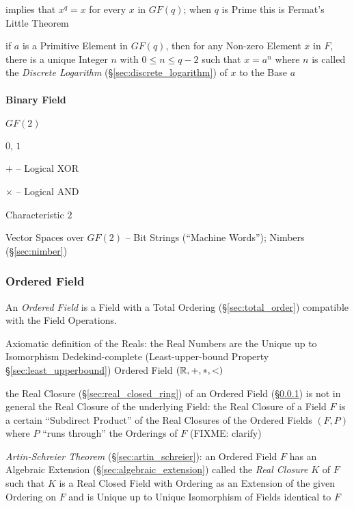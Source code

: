 implies that $x^q = x$ for every $x$ in $GF(q)$; when $q$ is Prime this is
Fermat's Little Theorem

if $a$ is a Primitive Element in $GF(q)$, then for any Non-zero Element $x$ in
$F$, there is a unique Integer $n$ with $0 \leq n \leq q - 2$ such that
$x = a^n$ where $n$ is called the \emph{Discrete Logarithm}
(\S\ref{sec:discrete_logarithm}) of $x$ to the Base $a$



\paragraph{Binary Field}\label{sec:binary_field}\hfill

$GF(2)$

$0$, $1$

$+$ -- Logical XOR

$\times$ -- Logical AND

Characteristic $2$

Vector Spaces over $GF(2)$ -- Bit Strings (``Machine Words''); \fist Nimbers
(\S\ref{sec:nimber})



\subsubsection{Ordered Field}\label{sec:ordered_field}

An \emph{Ordered Field} is a Field with a Total Ordering
(\S\ref{sec:total_order}) compatible with the Field Operations.

Axiomatic definition of the Reals: the Real Numbers are the Unique up to
Isomorphism Dedekind-complete (Least-upper-bound Property
\S\ref{sec:least_upperbound}) Ordered Field $(\mathbb{R}, +, *, <)$

the Real Closure (\S\ref{sec:real_closed_ring}) of an Ordered Field
(\S\ref{sec:ordered_field}) is not in general the Real Closure of the
underlying Field: the Real Closure of a Field $F$ is a certain ``Subdirect
Product'' of the Real Closures of the Ordered Fields $(F,P)$ where $P$ ``runs
through'' the Orderings of $F$ (FIXME: clarify)

\emph{Artin-Schreier Theorem} (\S\ref{sec:artin_schreier}): an Ordered Field
$F$ has an Algebraic Extension (\S\ref{sec:algebraic_extension}) called the
\emph{Real Closure} $K$ of $F$ such that $K$ is a Real Closed Field with
Ordering as an Extension of the given Ordering on $F$ and is Unique up to
Unique Isomorphism of Fields identical to $F$

